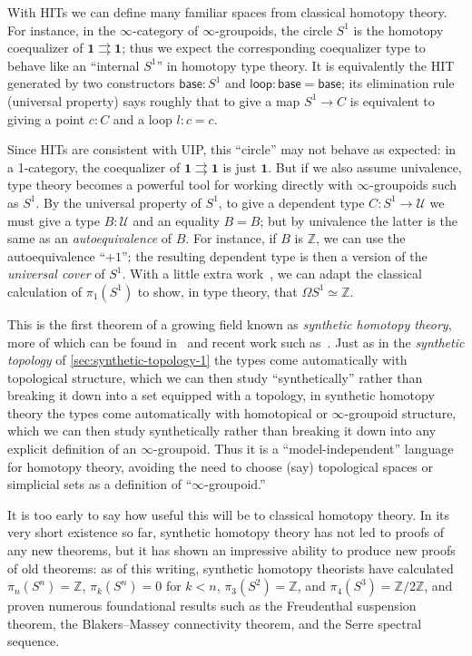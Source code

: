 \documentclass[10pt]{article}
\def\oo{\ensuremath{\infty}}
\def\Z{\mathbb{Z}}
\def\U{\mathscr{U}}
\def\hocirc{S^1}
\def\unit{\mathbf{1}}
\def\base{\mathsf{base}}
\def\lloop{\mathsf{loop}}
\numberwithin{equation}{section}
\begin{document}
With HITs we can define many familiar spaces from classical homotopy theory.
For instance, in the $\oo$-category of $\oo$-groupoids, the circle $\hocirc$ is the homotopy coequalizer of $\unit \rightrightarrows \unit$; thus we expect the corresponding coequalizer type to behave like an ``internal $\hocirc$'' in homotopy type theory.
It is equivalently the HIT generated by two constructors $\base:\hocirc$ and $\lloop :\base=\base$; its elimination rule (universal property) says roughly that to give a map $\hocirc \to C$ is equivalent to giving a point $c:C$ and a loop $l:c=c$.

Since HITs are consistent with UIP, this ``circle'' may not behave as expected: in a 1-category, the coequalizer of $\unit \rightrightarrows \unit$ is just $\unit$.
But if we also assume univalence, type theory becomes a powerful tool for working directly with $\oo$-groupoids such as $\hocirc$.
By the universal property of $\hocirc$, to give a dependent type $C:\hocirc \to \U$ we must give a type $B:\U$ and an equality $B=B$; but by univalence the latter is the same as an \emph{autoequivalence} of $B$.
For instance, if $B$ is $\Z$, we can use the autoequivalence ``$+1$''; the resulting dependent type is then a version of the \emph{universal cover} of $\hocirc$.
With a little extra work~\cite{ls:pi1s1}, we can adapt the classical calculation of $\pi_1(\hocirc)$ to show, in type theory, that $\Omega \hocirc \simeq \Z$.

This is the first theorem of a growing field known as \emph{synthetic homotopy theory}, more of which can be found in~\cite[Chapter 8]{hottbook} and recent work such as~\cite{lf:emspaces,ffll:blakers-massey,brunerie:thesis}.
Just as in the \emph{synthetic topology} of \cref{sec:synthetic-topology-1} the types come automatically with topological structure, which we can then study ``synthetically'' rather than breaking it down into a set equipped with a topology, in synthetic homotopy theory the types come automatically with homotopical or $\oo$-groupoid structure, which we can then study synthetically rather than breaking it down into any explicit definition of an $\oo$-groupoid.
Thus it is a ``model-independent'' language for homotopy theory, avoiding the need to choose (say) topological spaces or simplicial sets as a definition of ``$\oo$-groupoid.''

It is too early to say how useful this will be to classical homotopy theory.
In its very short existence so far, synthetic homotopy theory has not led to proofs of any new theorems, but it has shown an impressive ability to produce new proofs of old theorems:
as of this writing, synthetic homotopy theorists have calculated $\pi_n(S^n)=\Z$, $\pi_k(S^n)=0$ for $k<n$, $\pi_3(S^2)=\Z$, and $\pi_4(S^3)=\Z/2\Z$, and proven numerous foundational results such as the Freudenthal suspension theorem, the Blakers--Massey connectivity theorem, and the Serre spectral sequence.
\end{document}
